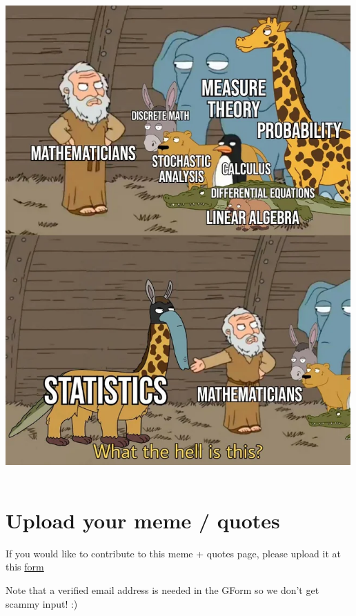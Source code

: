 \documentclass[
  letterpaper,
  DIV=11,
  numbers=noendperiod]{scrreprt}
\theoremstyle{definition}
\theoremstyle{plain}
\theoremstyle{remark}
\begin{document}
\includegraphics[width=5.20833in,height=7.29167in]{./assets/img/meme/meme2.webp}

\hypertarget{upload-your-meme-quotes}{%
\section*{Upload your meme / quotes}\label{upload-your-meme-quotes}}


If you would like to contribute to this meme + quotes page, please
upload it at this \href{https://forms.gle/RBmMNYJp4u3qD5W79}{form}

Note that a verified email address is needed in the GForm so we don't
get scammy input! :)

\(\,\)
\end{document}
